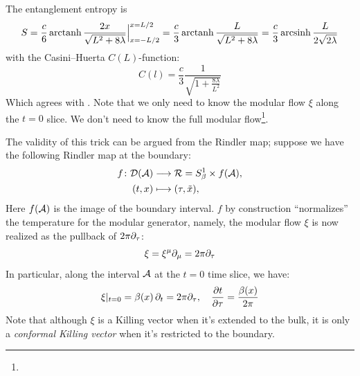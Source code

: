 \documentclass[11pt,a4paper,utf8]{article}
\begin{document}
	The entanglement entropy is
	\begin{equation}
	S=\frac{c}{6}\operatorname{arctanh}\frac{2x}{\sqrt{L^2 + 8\lambda}}\Big|_{x=-L/2}^{x=L/2}
	=\frac{c}{3}\operatorname{arctanh}\frac{L}{\sqrt{L^2 + 8\lambda}}
	=\frac{c}{3}\operatorname{arcsinh}\frac{L}{2\sqrt{2\lambda}}
	\end{equation}
	with the Casini--Huerta $C(L)$-function:
	\begin{equation}
	C(l)=\frac{c}{3}\frac{1}{\sqrt{1+\frac{8\lambda}{L^2}}}
	\end{equation}
	Which agrees with \cite{Lewkowycz:2019xse}. 
	Note that we only need to know the modular flow $\xi$ along the $t = 0$ slice. We don't need to know the full modular flow\footnote{
	}. 
	
	The validity of this trick can be argued from the Rindler map; suppose we have the following Rindler map at the boundary:
	\begin{equation}
	\begin{aligned}
		f\colon
		\mathcal{D}(\mathcal{A})
		&\longrightarrow \mathcal{R} = S^1_\beta \times f(\mathcal{A}), \\
		(t,x)
		&\longmapsto (\tau,\tilde{x}),
	\end{aligned}
	\end{equation}
	Here $f(\mathcal{A})$ is the image of the boundary interval. $f$ by construction ``normalizes'' the temperature for the modular generator, namely, the modular flow $\xi$ is now realized as the pullback of $2\pi\partial_{\tau}$:
	\begin{equation}
		\xi = \xi^\mu \partial_{\mu}
		= 2\pi\partial_{\tau}
	\end{equation}
	In particular, along the interval $\mathcal{A}$ at the $t = 0$ time slice, we have:
	\begin{equation}
		\xi|_{t = 0}
		= \beta(x)\,\partial_{t}
		= 2\pi\partial_{\tau},
	\quad
		\frac{\partial{t}}{\partial{\tau}}
		= \frac{\beta(x)}{2\pi}
	\end{equation}
	Note that although $\xi$ is a Killing vector when it's extended to the bulk, it is only a \textit{conformal Killing vector} when it's restricted to the boundary. 
	
\end{document}
